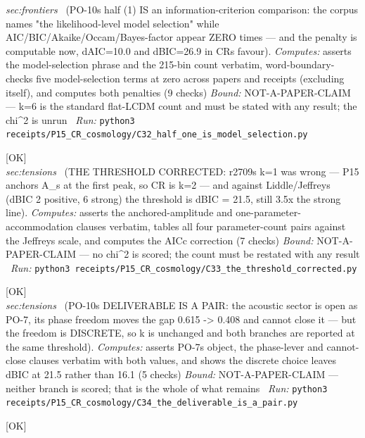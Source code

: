 \begin{description}
\textit{sec:frontiers} \ (PO-10s half (1) IS an information-criterion comparison: the corpus names "the likelihood-level model selection" while AIC/BIC/Akaike/Occam/Bayes-factor appear ZERO times --- and the penalty is computable now, dAIC=10.0 and dBIC=26.9 in CRs favour). 
\emph{Computes:} asserts the model-selection phrase and the 215-bin count verbatim, word-boundary-checks five model-selection terms at zero across papers and receipts (excluding itself), and computes both penalties (9 checks)
 \emph{Bound:} NOT-A-PAPER-CLAIM --- k=6 is the standard flat-LCDM count and must be stated with any result; the chi\textasciicircum{}2 is unrun
\ \emph{Run:} \texttt{python3 receipts/P15\_CR\_cosmology/C32\_half\_one\_is\_model\_selection.py}
\item[\rcptlabel{C33_the_threshold_corrected}{P15R123}\textbf{P15R123}\quad\texttt{C33\_the\_threshold\_corrected}]\hfill\textsf{[OK]}\\
\textit{sec:tensions} \ (THE THRESHOLD CORRECTED: r2709s k=1 was wrong --- P15 anchors A\_s at the first peak, so CR is k=2 --- and against Liddle/Jeffreys (dBIC 2 positive, 6 strong) the threshold is dBIC = 21.5, still 3.5x the strong line). 
\emph{Computes:} asserts the anchored-amplitude and one-parameter-accommodation clauses verbatim, tables all four parameter-count pairs against the Jeffreys scale, and computes the AICc correction (7 checks)
 \emph{Bound:} NOT-A-PAPER-CLAIM --- no chi\textasciicircum{}2 is scored; the count must be restated with any result
\ \emph{Run:} \texttt{python3 receipts/P15\_CR\_cosmology/C33\_the\_threshold\_corrected.py}
\item[\rcptlabel{C34_the_deliverable_is_a_pair}{P15R124}\textbf{P15R124}\quad\texttt{C34\_the\_deliverable\_is\_a\_pair}]\hfill\textsf{[OK]}\\
\textit{sec:tensions} \ (PO-10s DELIVERABLE IS A PAIR: the acoustic sector is open as PO-7, its phase freedom moves the gap 0.615 -> 0.408 and cannot close it --- but the freedom is DISCRETE, so k is unchanged and both branches are reported at the same threshold). 
\emph{Computes:} asserts PO-7s object, the phase-lever and cannot-close clauses verbatim with both values, and shows the discrete choice leaves dBIC at 21.5 rather than 16.1 (5 checks)
 \emph{Bound:} NOT-A-PAPER-CLAIM --- neither branch is scored; that is the whole of what remains
\ \emph{Run:} \texttt{python3 receipts/P15\_CR\_cosmology/C34\_the\_deliverable\_is\_a\_pair.py}
\item[\rcptlabel{C35_the_reference_is_F3}{P15R125}\textbf{P15R125}\quad\texttt{C35\_the\_reference\_is\_F3}]\hfill\textsf{[OK]}\\

\end{description}

